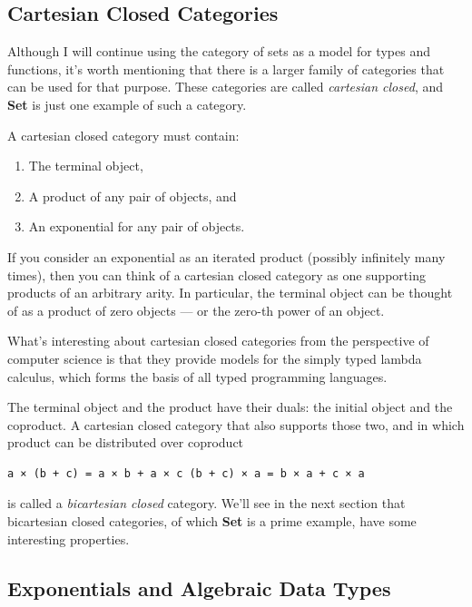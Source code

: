 \subsection{Cartesian Closed
Categories}\label{cartesian-closed-categories}

Although I will continue using the category of sets as a model for types
and functions, it's worth mentioning that there is a larger family of
categories that can be used for that purpose. These categories are
called \emph{cartesian closed}, and \textbf{Set} is just one example of
such a category.

A cartesian closed category must contain:

\begin{enumerate}
\tightlist
\item
  The terminal object,
\item
  A product of any pair of objects, and
\item
  An exponential for any pair of objects.
\end{enumerate}

If you consider an exponential as an iterated product (possibly
infinitely many times), then you can think of a cartesian closed
category as one supporting products of an arbitrary arity. In
particular, the terminal object can be thought of as a product of zero
objects --- or the zero-th power of an object.

What's interesting about cartesian closed categories from the
perspective of computer science is that they provide models for the
simply typed lambda calculus, which forms the basis of all typed
programming languages.

The terminal object and the product have their duals: the initial object
and the coproduct. A cartesian closed category that also supports those
two, and in which product can be distributed over coproduct

\begin{verbatim}
a × (b + c) = a × b + a × c (b + c) × a = b × a + c × a
\end{verbatim}

is called a \emph{bicartesian closed} category. We'll see in the next
section that bicartesian closed categories, of which \textbf{Set} is a
prime example, have some interesting properties.

\subsection{Exponentials and Algebraic Data
Types}\label{exponentials-and-algebraic-data-types}

